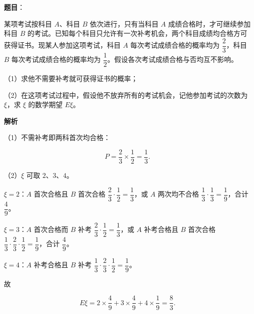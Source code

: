 \begin{answer}

\textbf{题目}：

某项考试按科目 $A$、科目 $B$ 依次进行，只有当科目 $A$ 成绩合格时，才可继续参加科目 $B$ 的考试。已知每个科目只允许有一次补考机会，两个科目成绩均合格方可获得证书。现某人参加这项考试，科目 $A$ 每次考试成绩合格的概率均为 $\dfrac23$，科目 $B$ 每次考试成绩合格的概率均为 $\dfrac12$。假设各次考试成绩合格与否均互不影响。

（1）求他不需要补考就可获得证书的概率；

（2）在这项考试过程中，假设他不放弃所有的考试机会，记他参加考试的次数为 $\xi$，求 $\xi$ 的数学期望 $E\xi$。

\textbf{解析}

（1）不需补考即两科首次均合格：

\nopagebreak[4]
\[P=\frac23\times\frac12=\frac13.\]

（2）$\xi$ 可取 $2$、$3$、$4$。

$\xi=2$：$A$ 首次合格且 $B$ 首次合格 $\dfrac23\cdot\dfrac12=\dfrac13$，或 $A$ 两次均不合格 $\dfrac13\cdot\dfrac13=\dfrac19$，合计 $\dfrac49$。

$\xi=3$：$A$ 首次合格而 $B$ 补考 $\dfrac23\cdot\dfrac12=\dfrac13$，或 $A$ 补考合格且 $B$ 首次合格 $\dfrac13\cdot\dfrac23\cdot\dfrac12=\dfrac19$，合计 $\dfrac49$。

$\xi=4$：$A$ 补考合格且 $B$ 补考 $\dfrac13\cdot\dfrac23\cdot\dfrac12=\dfrac19$。

故

\nopagebreak[4]
\[E\xi=2\times\frac49+3\times\frac49+4\times\frac19=\frac83.\]


\end{answer}
